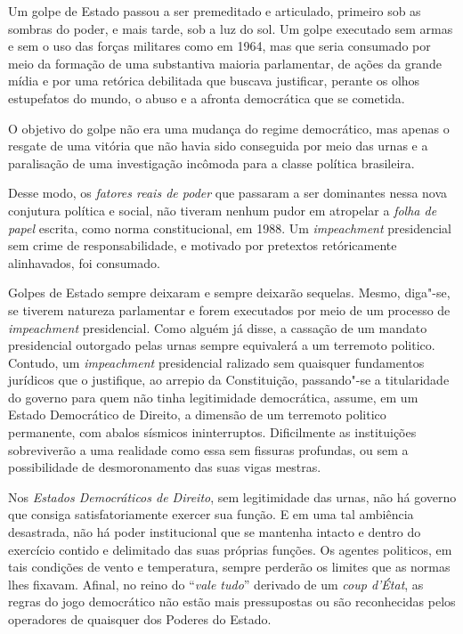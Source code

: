 Um golpe de Estado passou a ser premeditado e articulado, primeiro sob
as sombras do poder, e mais tarde, sob a luz do sol. Um golpe executado
sem armas e sem o uso das forças militares como em 1964, mas que seria
consumado por meio da formação de uma substantiva maioria parlamentar,
de ações da grande mídia e por uma retórica debilitada que buscava
justificar, perante os olhos estupefatos do mundo, o abuso e a afronta
democrática que se cometida.

O objetivo do golpe não era uma mudança do regime democrático, mas
apenas o resgate de uma vitória que não havia sido conseguida por meio
das urnas e a paralisação de uma investigação incômoda para a classe
política brasileira.

Desse modo, os \emph{fatores reais de poder} que passaram a ser
dominantes nessa nova conjutura política e social, não tiveram nenhum
pudor em atropelar a \emph{folha de papel} escrita, como norma
constitucional, em 1988. Um \emph{impeachment} presidencial sem crime de
responsabilidade, e motivado por pretextos retóricamente alinhavados,
foi consumado.

Golpes de Estado sempre deixaram e sempre deixarão sequelas. Mesmo,
diga"-se, se tiverem natureza parlamentar e forem executados por meio de
um processo de \emph{impeachment} presidencial. Como alguém já disse, a
cassação de um mandato presidencial outorgado pelas urnas sempre
equivalerá a um terremoto politico. Contudo, um \emph{impeachment}
presidencial ralizado sem quaisquer fundamentos jurídicos que o
justifique, ao arrepio da Constituição, passando"-se a titularidade do
governo para quem não tinha legitimidade democrática, assume, em um
Estado Democrático de Direito, a dimensão de um terremoto politico
permanente, com abalos sísmicos ininterruptos. Dificilmente as
instituições sobreviverão a uma realidade como essa sem fissuras
profundas, ou sem a possibilidade de desmoronamento das suas vigas
mestras.

Nos \emph{Estados Democráticos de Direito}, sem legitimidade das urnas,
não há governo que consiga satisfatoriamente exercer sua função. E em
uma tal ambiência desastrada, não há poder institucional que se mantenha
intacto e dentro do exercício contido e delimitado das suas próprias
funções. Os agentes politicos, em tais condições de vento e temperatura,
sempre perderão os limites que as normas lhes fixavam. Afinal, no reino
do ``\emph{vale tudo}'' derivado de um \emph{coup d'État}, as regras do
jogo democrático não estão mais pressupostas ou são reconhecidas pelos
operadores de quaisquer dos Poderes do Estado.

